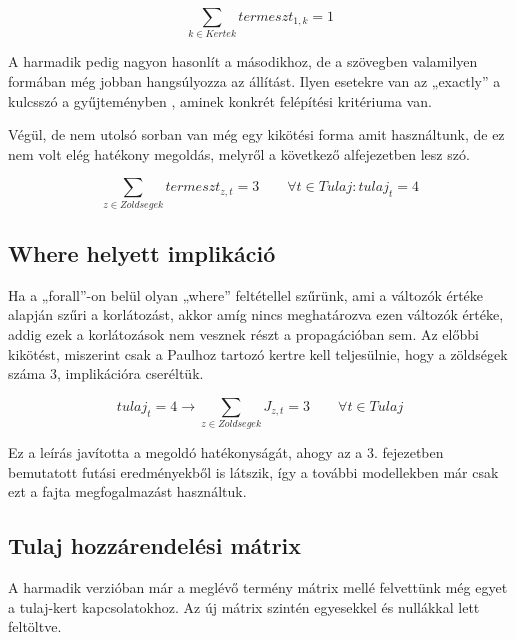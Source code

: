 \documentclass[12pt,a4paper,twoside, openright]{report}
\begin{document}
	\begin{equation}
    \sum_{k\in Kertek} termeszt_{1,k} =1 
    \end{equation}

    A harmadik pedig nagyon hasonlít a másodikhoz, de a szövegben valamilyen formában még jobban hangsúlyozza az állítást.
    Ilyen esetekre van az „exactly” a kulcsszó a gyűjteményben , aminek konkrét felépítési kritériuma van.


    Végül, de nem utolsó sorban van még egy kikötési forma amit használtunk, de ez nem volt elég hatékony megoldás, melyről a következő alfejezetben lesz szó.

    \begin{equation}
        \sum_{z\in Zoldsegek} termeszt_{z,t} = 3 \qquad \forall t\in Tulaj: tulaj_{t} = 4
    \end{equation}
    

\subsection{Where helyett implikáció}

    Ha a „forall”-on belül olyan „where” feltétellel szűrünk, ami a változók értéke alapján szűri a korlátozást, akkor amíg nincs meghatározva ezen változók értéke, addig ezek a korlátozások nem vesznek részt a propagációban sem.
    Az előbbi kikötést, miszerint csak a Paulhoz tartozó kertre kell teljesülnie, hogy a zöldségek száma 3, implikációra cseréltük.

    \begin{equation}
    tulaj_t=4 \rightarrow \sum_{z\in Zoldsegek} J_{z,t} =3 \qquad \forall t\in Tulaj
    \end{equation}

    Ez a leírás javította a megoldó hatékonyságát, ahogy az a 3. fejezetben bemutatott futási eredményekből is látszik, így a további modellekben már csak ezt a fajta megfogalmazást 
    használtuk.


\subsection{Tulaj hozzárendelési mátrix}

    A harmadik verzióban már a meglévő termény mátrix mellé felvettünk még egyet a tulaj-kert kapcsolatokhoz.
    Az új mátrix szintén egyesekkel és nullákkal lett feltöltve.

\end{document}
